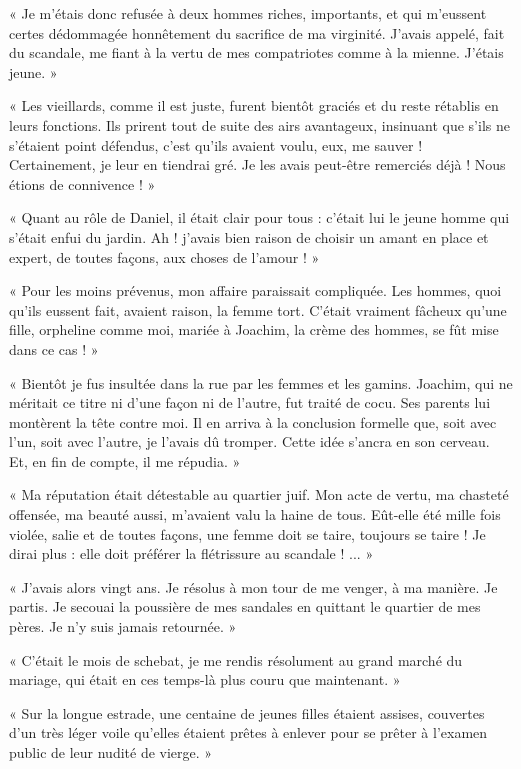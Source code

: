 \documentclass[a4paper, 11pt, oneside, polutonikogreek, french]{article}
\begin{document}
« Je m'étais donc refusée à deux hommes riches, importants, et qui m'eussent certes dédommagée honnêtement du sacrifice de ma virginité. J'avais appelé, fait du scandale, me fiant à la vertu de mes compatriotes comme à la mienne. J'étais jeune. »

« Les vieillards, comme il est juste, furent bientôt graciés et du reste rétablis en leurs fonctions. Ils prirent tout de suite des airs avantageux, insinuant que s'ils ne s'étaient point défendus, c'est qu'ils avaient voulu, eux, me sauver ! Certainement, je leur en tiendrai gré. Je les avais peut-être remerciés déjà ! Nous étions de connivence ! »

« Quant au rôle de Daniel, il était clair pour tous : c'était lui le jeune homme qui s'était enfui du jardin. Ah ! j'avais bien raison de choisir un amant en place et expert, de toutes façons, aux choses de l'amour ! »

« Pour les moins prévenus, mon affaire paraissait compliquée. Les hommes, quoi qu'ils eussent fait, avaient raison, la femme tort. C'était vraiment fâcheux qu'une fille, orpheline comme moi, mariée à Joachim, la crème des hommes, se fût mise dans ce cas ! »

« Bientôt je fus insultée dans la rue par les femmes et les gamins. Joachim, qui ne méritait ce titre ni d'une façon ni de l'autre, fut traité de cocu. Ses parents lui montèrent la tête contre moi. Il en arriva à la conclusion formelle que, soit avec l'un, soit avec l'autre, je l'avais dû tromper. Cette idée s'ancra en son cerveau. Et, en fin de compte, il me répudia. »

« Ma réputation était détestable au quartier juif. Mon acte de vertu, ma chasteté offensée, ma beauté aussi, m'avaient valu la haine de tous. Eût-elle été mille fois violée, salie et de toutes façons, une femme doit se taire, toujours se taire ! Je dirai plus : elle doit préférer la flétrissure au scandale ! ... »

\bigskip
\centerline{\EightStarTaper}
\centerline{\EightStarTaper\EightStarTaper}
\bigskip

« J'avais alors vingt ans. Je résolus à mon tour de me venger, à ma manière. Je partis. Je secouai la poussière de mes sandales en quittant le quartier de mes pères. Je n'y suis jamais retournée. »

« C'était le mois de schebat, je me rendis résolument au grand marché du mariage, qui était en ces temps-là plus couru que maintenant. »

« Sur la longue estrade, une centaine de jeunes filles étaient assises, couvertes d'un très léger voile qu'elles étaient prêtes à enlever pour se prêter à l'examen public de leur nudité de vierge. »
\end{document}
